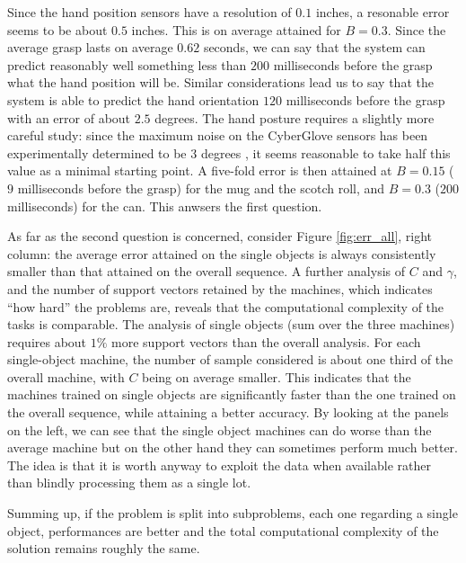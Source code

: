 Since the hand position sensors have a resolution of $0.1$ inches, a
resonable error seems to be about $0.5$ inches. This is on average
attained for $B=0.3$. Since the average grasp lasts on average $0.62$
seconds, we can say that the system can predict reasonably well
something less than $200$ milliseconds before the grasp what the hand
position will be. Similar considerations lead us to say that the
system is able to predict the hand orientation $120$ milliseconds
before the grasp with an error of about $2.5$ degrees. The hand
posture requires a slightly more careful study: since the maximum
noise on the CyberGlove sensors has been experimentally determined to
be $3$ degrees \cite{212431}, it seems reasonable to take half this
value as a minimal starting point. A five-fold error is then attained
at $B=0.15$ ($9$ milliseconds before the grasp) for the mug and the
scotch roll, and $B=0.3$ ($200$ milliseconds) for the can. This
anwsers the first question.

As far as the second question is concerned, consider Figure
\ref{fig:err_all}, right column: the average error attained on the
single objects is always consistently smaller than that attained on
the overall sequence. A further analysis of $C$ and $\gamma$, and the
number of support vectors retained by the machines, which indicates
``how hard'' the problems are, reveals that the computational
complexity of the tasks is comparable. The analysis of single objects
(sum over the three machines) requires about $1\%$ more support
vectors than the overall analysis. For each single-object machine, the
number of sample considered is about one third of the overall machine,
with $C$ being on average smaller. This indicates that the machines
trained on single objects are significantly faster than the one
trained on the overall sequence, while attaining a better accuracy.
By looking at the panels on the left, we can see that the single
object machines can do worse than the average machine but on the 
other hand they can sometimes perform much better. The idea is that 
it is worth anyway to exploit the data when available rather 
than blindly processing them as a single lot.

Summing up, if the problem is split into subproblems, each one
regarding a single object, performances are better and the total
computational complexity of the solution remains roughly the same.
